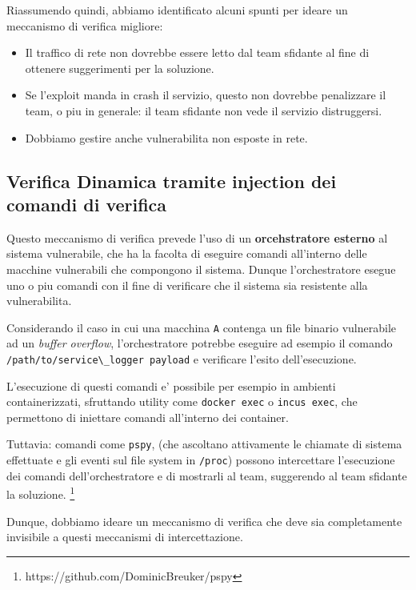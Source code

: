 Riassumendo quindi, abbiamo identificato alcuni spunti per ideare un
meccanismo di verifica migliore:

\begin{itemize}
\tightlist
\item
  Il traffico di rete non dovrebbe essere letto dal team sfidante al
  fine di ottenere suggerimenti per la soluzione.
\item
  Se l'exploit manda in crash il servizio, questo non dovrebbe
  penalizzare il team, o piu in generale: il team sfidante non vede il
  servizio distruggersi.
\item
  Dobbiamo gestire anche vulnerabilita non esposte in rete.
\end{itemize}

\subsection{Verifica Dinamica tramite injection dei comandi di
verifica}\label{verifica-dinamica-tramite-injection-dei-comandi-di-verifica}

Questo meccanismo di verifica prevede l'uso di un \textbf{orcehstratore
esterno} al sistema vulnerabile, che ha la facolta di eseguire comandi
all'interno delle macchine vulnerabili che compongono il sistema. Dunque
l'orchestratore esegue uno o piu comandi con il fine di verificare che
il sistema sia resistente alla vulnerabilita.

Considerando il caso in cui una macchina \passthrough{\lstinline!A!}
contenga un file binario vulnerabile ad un \emph{buffer overflow},
l'orchestratore potrebbe eseguire ad esempio il comando
\passthrough{\lstinline!/path/to/service\_logger payload!} e verificare
l'esito dell'esecuzione.

L'esecuzione di questi comandi e' possibile per esempio in ambienti
containerizzati, sfruttando utility come
\passthrough{\lstinline!docker exec!} o
\passthrough{\lstinline!incus exec!}, che permettono di iniettare
comandi all'interno dei container.

Tuttavia: comandi come \passthrough{\lstinline!pspy!}, (che ascoltano
attivamente le chiamate di sistema effettuate e gli eventi sul file
system in \passthrough{\lstinline!/proc!}) possono intercettare
l'esecuzione dei comandi dell'orchestratore e di mostrarli al team,
suggerendo al team sfidante la soluzione. \footnote{\label{fn:ref_13}https://github.com/DominicBreuker/pspy}

Dunque, dobbiamo ideare un meccanismo di verifica che deve sia
completamente invisibile a questi meccanismi di intercettazione.

